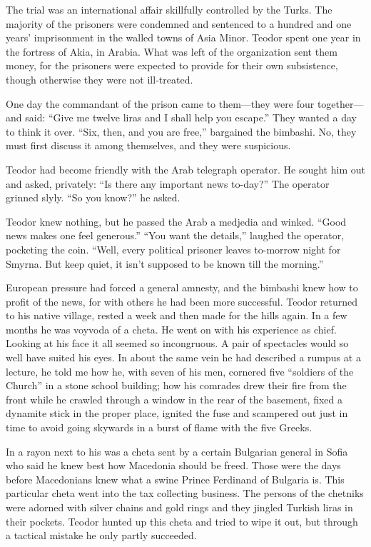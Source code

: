\documentclass[a5paper,12pt]{book}
\begin{document}
The trial was an international affair skillfully controlled by the Turks. The majority of the prisoners were condemned and sentenced to a hundred and one years’ imprisonment in the walled towns of Asia Minor. Teodor spent one year in the fortress of Akia, in Arabia. What was left of the organization sent them money, for the prisoners were expected to provide for their own subsistence, though otherwise they were not ill-treated.

One day the commandant of the prison came to them—they were four together—and said: “Give me twelve liras and I shall help you escape.” They wanted a day to think it over. “Six, then, and you are free,” bargained the bimbashi. No, they must first discuss it among themselves, and they were suspicious.

Teodor had become friendly with the Arab telegraph operator. He sought him out and asked, privately: “Is there any important news to-day?” The operator grinned slyly. “So you know?” he asked.

Teodor knew nothing, but he passed the Arab a medjedia and winked. “Good news makes one feel generous.” “You want the details,” laughed the operator, pocketing the coin. “Well, every political prisoner leaves to-morrow night for Smyrna. But keep quiet, it isn’t supposed to be known till the morning.”

European pressure had forced a general amnesty, and the bimbashi knew how to profit of the news, for with others he had been more successful. Teodor returned to his native village, rested a week and then made for the hills again. In a few months he was voyvoda of a cheta. He went on with his experience as chief. Looking at his face it all seemed so incongruous. A pair of spectacles would so well have suited his eyes. In about the same vein he had described a rumpus at a lecture, he told me how he, with seven of his men, cornered five “soldiers of the Church” in a stone school building; how his comrades drew their fire from the front while he crawled through a window in the rear of the basement, fixed a dynamite stick in the proper place, ignited the fuse and scampered out just in time to avoid going skywards in a burst of flame with the five Greeks.

In a rayon next to his was a cheta sent by a certain Bulgarian general in Sofia who said he knew best how Macedonia should be freed. Those were the days before Macedonians knew what a swine Prince Ferdinand of Bulgaria is. This particular cheta went into the tax collecting business. The persons of the chetniks were adorned with silver chains and gold rings and they jingled Turkish liras in their pockets. Teodor hunted up this cheta and tried to wipe it out, but through a tactical mistake he only partly succeeded.
\end{document}
